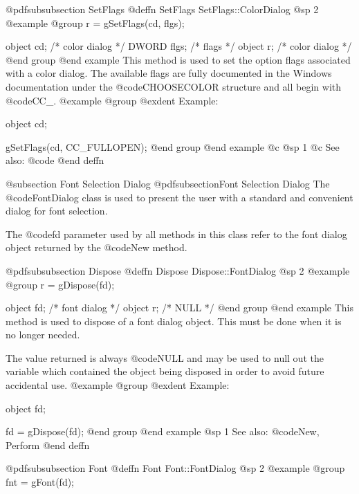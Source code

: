 @pdfsubsubsection {SetFlags}
@deffn {SetFlags} SetFlags::ColorDialog
@sp 2
@example
@group
r = gSetFlags(cd, flgs);

object  cd;     /*  color dialog  */
DWORD   flgs;   /*  flags         */
object  r;      /*  color dialog  */
@end group
@end example
This method is used to set the option flags associated with a color dialog.
The available flags are fully documented in the Windows documentation
under the @code{CHOOSECOLOR} structure and all begin with @code{CC_}.
@example
@group
@exdent Example:

object  cd;

gSetFlags(cd, CC_FULLOPEN);
@end group
@end example
@c @sp 1
@c See also:  @code{}
@end deffn











@subsection Font Selection Dialog
@pdfsubsection{Font Selection Dialog}
The @code{FontDialog} class is used to present the user with a standard
and convenient dialog for font selection.

The @code{fd} parameter used by all methods in this class refer to
the font dialog object returned by the @code{New} method.








@pdfsubsubsection {Dispose}
@deffn {Dispose} Dispose::FontDialog
@sp 2
@example
@group
r = gDispose(fd);

object  fd;     /*  font dialog   */
object  r;      /*  NULL          */
@end group
@end example
This method is used to dispose of a font dialog object.  This must
be done when it is no longer needed.

The value returned is always @code{NULL} and may be used to null out
the variable which contained the object being disposed in order to
avoid future accidental use.
@example
@group
@exdent Example:

object  fd;

fd = gDispose(fd);
@end group
@end example
@sp 1
See also:  @code{New, Perform}
@end deffn











@pdfsubsubsection {Font}
@deffn {Font} Font::FontDialog
@sp 2
@example
@group
fnt = gFont(fd);

